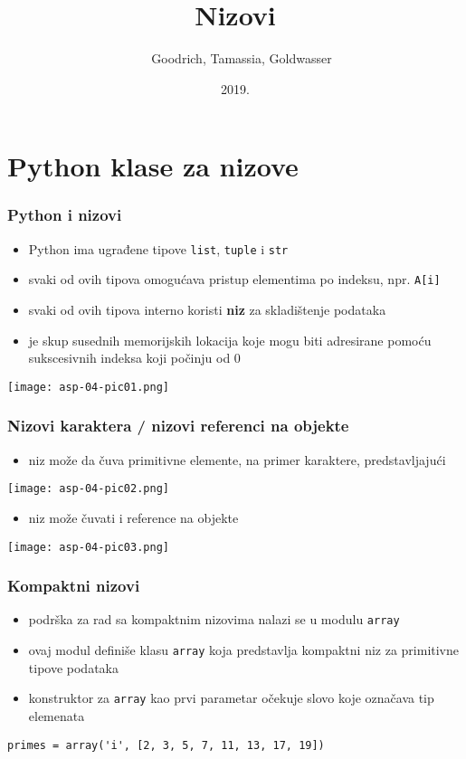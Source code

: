 \documentclass[compress]{beamer}
\title{Nizovi}
\author{\textcopyright \ \ Goodrich, Tamassia, Goldwasser}
\institute{Katedra za informatiku, Fakultet tehničkih nauka, Univerzitet u
Novom Sadu}
\date{2019.}
\begin{document}
\frame{\titlepage}

\section[Python]{Python klase za nizove}
\begin{frame}[fragile]
  \frametitle{Python i nizovi}
  \begin{itemize}
    \item Python ima ugrađene tipove \texttt{list}, \texttt{tuple} i
    \texttt{str}
    \item svaki od ovih tipova omogućava pristup elementima po indeksu, npr.
    \texttt{A[i]}
    \item svaki od ovih tipova interno koristi \textbf{niz} za skladištenje
    podataka
    \item {} je skup susednih memorijskih lokacija koje mogu biti
    adresirane pomoću sukscesivnih indeksa koji počinju od 0
  \end{itemize}
  \begin{center}
    \texttt{[image: asp-04-pic01.png]}
  \end{center}
\end{frame}


\begin{frame}[fragile]
  \frametitle{Nizovi karaktera / nizovi referenci na objekte}
  \begin{itemize}
    \item niz može da čuva primitivne elemente, na primer karaktere,
    predstavljajući 
  \end{itemize}
  \begin{center}
    \texttt{[image: asp-04-pic02.png]}
  \end{center}
  \begin{itemize}
    \item niz može čuvati i reference na objekte
  \end{itemize}
  \begin{center}
    \texttt{[image: asp-04-pic03.png]}
  \end{center}
\end{frame}

\begin{frame}[fragile]
  \frametitle{Kompaktni nizovi}
  \begin{itemize}
    \item podrška za rad sa kompaktnim nizovima nalazi se u modulu
    \texttt{array}
    \item ovaj modul definiše klasu \texttt{array} koja predstavlja kompaktni
    niz za primitivne tipove podataka
    \item konstruktor za \texttt{array} kao prvi parametar očekuje slovo koje
    označava tip elemenata
  \end{itemize}
\begin{verbatim}
primes = array('i', [2, 3, 5, 7, 11, 13, 17, 19])
\end{verbatim}
\end{frame}
\end{document}
